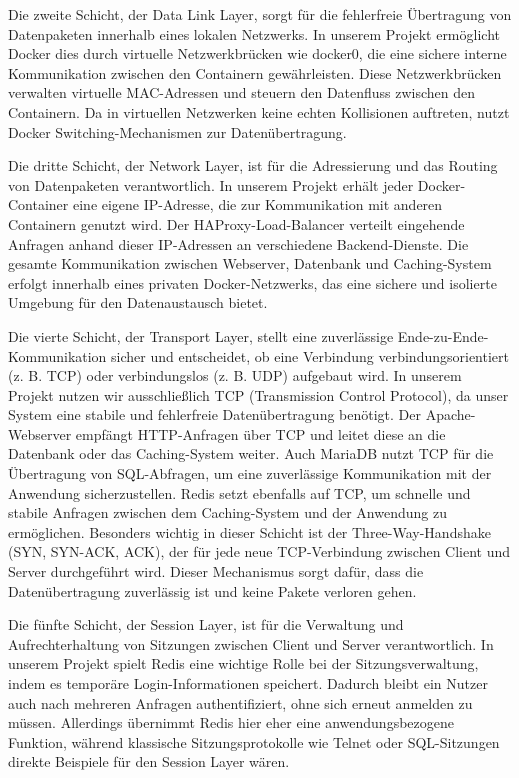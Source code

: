 Die zweite Schicht, der Data Link Layer, sorgt für die fehlerfreie Übertragung von Datenpaketen innerhalb eines lokalen Netzwerks. In unserem Projekt ermöglicht Docker dies durch virtuelle Netzwerkbrücken wie docker0, die eine sichere interne Kommunikation zwischen den Containern gewährleisten. Diese Netzwerkbrücken verwalten virtuelle MAC-Adressen und steuern den Datenfluss zwischen den Containern. Da in virtuellen Netzwerken keine echten Kollisionen auftreten, nutzt Docker Switching-Mechanismen zur Datenübertragung.

Die dritte Schicht, der Network Layer, ist für die Adressierung und das Routing von Datenpaketen verantwortlich. In unserem Projekt erhält jeder Docker-Container eine eigene IP-Adresse, die zur Kommunikation mit anderen Containern genutzt wird. Der HAProxy-Load-Balancer verteilt eingehende Anfragen anhand dieser IP-Adressen an verschiedene Backend-Dienste. Die gesamte Kommunikation zwischen Webserver, Datenbank und Caching-System erfolgt innerhalb eines privaten Docker-Netzwerks, das eine sichere und isolierte Umgebung für den Datenaustausch bietet.

Die vierte Schicht, der Transport Layer, stellt eine zuverlässige Ende-zu-Ende-Kommunikation sicher und entscheidet, ob eine Verbindung verbindungsorientiert (z. B. TCP) oder verbindungslos (z. B. UDP) aufgebaut wird. In unserem Projekt nutzen wir ausschließlich TCP (Transmission Control Protocol), da unser System eine stabile und fehlerfreie Datenübertragung benötigt. Der Apache-Webserver empfängt HTTP-Anfragen über TCP und leitet diese an die Datenbank oder das Caching-System weiter. Auch MariaDB nutzt TCP für die Übertragung von SQL-Abfragen, um eine zuverlässige Kommunikation mit der Anwendung sicherzustellen. Redis setzt ebenfalls auf TCP, um schnelle und stabile Anfragen zwischen dem Caching-System und der Anwendung zu ermöglichen. Besonders wichtig in dieser Schicht ist der Three-Way-Handshake (SYN, SYN-ACK, ACK), der für jede neue TCP-Verbindung zwischen Client und Server durchgeführt wird. Dieser Mechanismus sorgt dafür, dass die Datenübertragung zuverlässig ist und keine Pakete verloren gehen.

Die fünfte Schicht, der Session Layer, ist für die Verwaltung und Aufrechterhaltung von Sitzungen zwischen Client und Server verantwortlich. In unserem Projekt spielt Redis eine wichtige Rolle bei der Sitzungsverwaltung, indem es temporäre Login-Informationen speichert. Dadurch bleibt ein Nutzer auch nach mehreren Anfragen authentifiziert, ohne sich erneut anmelden zu müssen. Allerdings übernimmt Redis hier eher eine anwendungsbezogene Funktion, während klassische Sitzungsprotokolle wie Telnet oder SQL-Sitzungen direkte Beispiele für den Session Layer wären.

